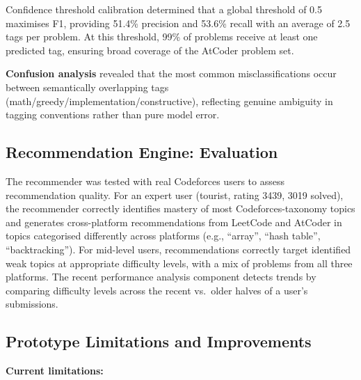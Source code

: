 \documentclass[12pt,a4paper]{article}
\begin{document}
Confidence threshold calibration determined that a global threshold of 0.5 maximises F1, providing 51.4\% precision and 53.6\% recall with an average of 2.5 tags per problem. At this threshold, 99\% of problems receive at least one predicted tag, ensuring broad coverage of the AtCoder problem set.

\textbf{Confusion analysis} revealed that the most common misclassifications occur between semantically overlapping tags (math/greedy/implementation/constructive), reflecting genuine ambiguity in tagging conventions rather than pure model error.

\subsection{Recommendation Engine: Evaluation}

The recommender was tested with real Codeforces users to assess recommendation quality. For an expert user (tourist, rating 3439, 3019 solved), the recommender correctly identifies mastery of most Codeforces-taxonomy topics and generates cross-platform recommendations from LeetCode and AtCoder in topics categorised differently across platforms (e.g., ``array'', ``hash table'', ``backtracking''). For mid-level users, recommendations correctly target identified weak topics at appropriate difficulty levels, with a mix of problems from all three platforms. The recent performance analysis component detects trends by comparing difficulty levels across the recent vs.\ older halves of a user's submissions.

\subsection{Prototype Limitations and Improvements}

\textbf{Current limitations:}
\end{document}
